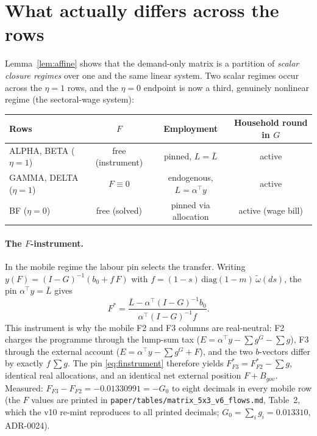 \documentclass[11pt]{article}
\numberwithin{equation}{section}
\newcommand{\Lbar}{\bar{L}}
\begin{document}
\section{What actually differs across the rows}\label{sec:gauge}

Lemma~\ref{lem:affine} shows that the demand-only matrix is a partition of
\emph{scalar closure regimes} over one and the same linear system.
\textcolor{revisionV3}{Two scalar regimes occur across the $\eta = 1$
rows, and the $\eta = 0$ endpoint is now a third, genuinely nonlinear
regime (the sectoral-wage system):}

\begin{center}
{\small
\begin{tabular}{lccc}
\toprule
Rows & $F$ & Employment & Household round in $G$ \\
\midrule
ALPHA, BETA ($\eta = 1$) & free (instrument) & pinned, $L = \Lbar$ & active \\
GAMMA, DELTA ($\eta = 1$) & $F \equiv 0$ & endogenous, $L = \alpha^{\!\top}y$ & active \\
\textcolor{revisionV1}{BF ($\eta = 0$)} & \textcolor{revisionV1}{free (solved)} & \textcolor{revisionV1}{pinned via allocation} & \textcolor{revisionV1}{active (wage bill)} \\
\bottomrule
\end{tabular}
}
\end{center}

\paragraph{The $F$-instrument.} In the mobile regime the labour pin selects
the transfer. Writing $y(F) = (I-G)^{-1}(b_0 + f\,F)$ with
$f = (1-s)\,\mathrm{diag}(1-m)\,\tilde\omega(ds)$, the pin
$\alpha^{\!\top}y = \Lbar$ gives
\begin{equation}
F^{\ast} = \frac{\Lbar - \alpha^{\!\top}(I-G)^{-1} b_0}
               {\alpha^{\!\top}(I-G)^{-1} f}.
\label{eq:finstrument}
\end{equation}
This instrument is why the mobile F2 and F3 columns are real-neutral: F2
charges the programme through the lump-sum tax ($E = \alpha^{\!\top}y -
\sum g^G - \sum g$), F3 through the external account ($E = \alpha^{\!\top}y
- \sum g^G + F$), and the two $b$-vectors differ by exactly
$f\,\sum g$. The pin \eqref{eq:finstrument} therefore yields
$F^{\ast}_{F3} = F^{\ast}_{F2} - \sum g$, identical real allocations, and
an identical net external position $F + B_{gov}$. Measured: $F_{F3} - F_{F2} = -0.01330991 = -G_0$ to eight
decimals in every mobile row (\textcolor{revisionV3}{the $F$ values are printed
in \texttt{paper/tables/matrix\_5x3\_v6\_flows.md}, Table~2, which the v10
re-mint reproduces to all printed decimals; $G_0 = \sum_i g_i = 0.013310$,
ADR-0024}).
\end{document}

